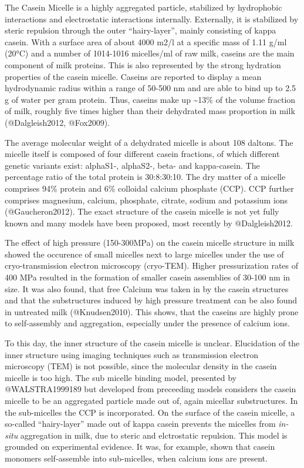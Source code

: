\documentclass[
]{article}
\begin{document}
The Casein Micelle is a highly aggregated particle, stabilized by
hydrophobic interactions and electrostatic interactions internally.
Externally, it is stabilized by steric repulsion through the outer
``hairy-layer'', mainly consisting of kappa casein. With a surface area
of about 4000 m2/l at a specific mass of 1.11 g/ml (20°C) and a number
of 1014-1016 micelles/ml of raw milk, caseins are the main component of
milk proteins. This is also represented by the strong hydration
properties of the casein micelle. Caseins are reported to display a mean
hydrodynamic radius within a range of 50-500 nm and are able to bind up
to 2.5 g of water per gram protein. Thus, caseins make up
\textasciitilde13\% of the volume fraction of milk, roughly five times
higher than their dehydrated mass proportion in milk (@Dalgleish2012,
@Fox2009).

The average molecular weight of a dehydrated micelle is about 108
daltons. The micelle itself is composed of four different casein
fractions, of which different genetic variants exist: alphaS1-,
alphaS2-, beta- and kappa-casein. The percentage ratio of the total
protein is 30:8:30:10. The dry matter of a micelle comprises 94\%
protein and 6\% colloidal calcium phosphate (CCP). CCP further comprises
magnesium, calcium, phosphate, citrate, sodium and potassium ions
(@Gaucheron2012). The exact structure of the casein micelle is not yet
fully known and many models have been proposed, most recently by
@Dalgleish2012.

The effect of high pressure (150-300MPa) on the casein micelle structure
in milk showed the occurence of small micelles next to large micelles
under the use of cryo-transmission electron microscopy (cryo-TEM).
Higher pressurization rates of 400 MPa resulted in the formation of
smaller casein assemblies of 30-100 nm in size. It was also found, that
free Calcium was taken in by the casein structures and that the
substructures induced by high pressure treatment can be also found in
untreated milk (@Knudsen2010). This shows, that the caseins are highly
prone to self-assembly and aggregation, especially under the presence of
calcium ions.

To this day, the inner structure of the casein micelle is unclear.
Elucidation of the inner structure using imaging techniques such as
transmission electron microscopy (TEM) is not possible, since the
molecular density in the casein micelle is too high. The sub micelle
binding model, presented by @WALSTRA1999189 but developed from
preceeding models considers the casein micelle to be an aggregated
particle made out of, again micellar substructures. In the sub-micelles
the CCP is incorporated. On the surface of the casein micelle, a
so-called ``hairy-layer'' made out of kappa casein prevents the micelles
from \emph{in-situ} aggregation in milk, due to steric and elctrostatic
repulsion. This model is grounded on experimental evidence. It was, for
example, shown that casein monomers self-assemble into sub-micelles,
when calcium ions are present.
\end{document}
